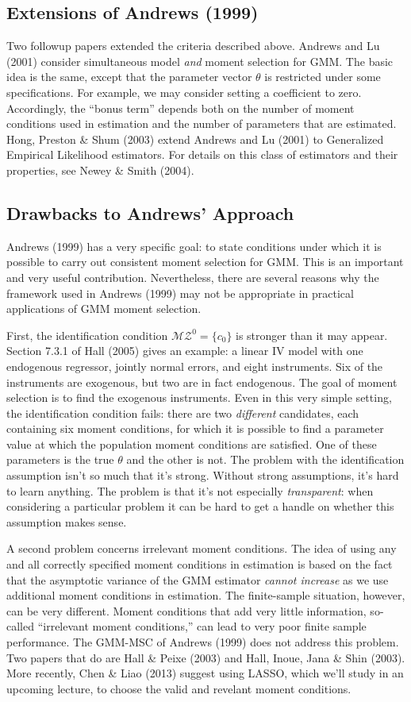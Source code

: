 \subsection{Extensions of Andrews (1999)}
Two followup papers extended the criteria described above. Andrews and Lu (2001) consider simultaneous model \emph{and} moment selection for GMM. The basic idea is the same, except that the parameter vector $\theta$ is restricted under some specifications. For example, we may consider setting a coefficient to zero. Accordingly, the ``bonus term'' depends both on the number of moment conditions used in estimation and the number of parameters that are estimated. Hong, Preston \& Shum (2003) extend Andrews and Lu (2001) to Generalized Empirical Likelihood estimators. For details on this class of estimators and their properties, see Newey \& Smith (2004). 

\subsection{Drawbacks to Andrews' Approach}
Andrews (1999) has a very specific goal: to state conditions under which it is possible to carry out consistent moment selection for GMM. This is an important and very useful contribution. Nevertheless, there are several reasons why the framework used in Andrews (1999) may not be appropriate in practical applications of GMM moment selection. 

First, the identification condition $\mathcal{MZ}^0 = \{c_0\}$ is stronger than it may appear. Section 7.3.1 of Hall (2005) gives an example: a linear IV model with one endogenous regressor, jointly normal errors, and eight instruments. Six of the instruments are exogenous, but two are in fact endogenous. The goal of moment selection is to find the exogenous instruments. Even in this very simple setting, the identification condition fails: there are two \emph{different} candidates, each containing six moment conditions, for which it is possible to find a parameter value at which the population moment conditions are satisfied. One of these parameters is the true $\theta$ and the other is not. The problem with the identification assumption isn't so much that it's strong. Without strong assumptions, it's hard to learn anything. The problem is that it's not especially \emph{transparent}: when considering a particular problem it can be hard to get a handle on whether this assumption makes sense.  


A second problem concerns irrelevant moment conditions. The idea of using any and all correctly specified moment conditions in estimation is based on the fact that the asymptotic variance of the GMM estimator \emph{cannot increase} as we use additional moment conditions in estimation. The finite-sample situation, however, can be very different. Moment conditions that add very little information, so-called ``irrelevant moment conditions,'' can lead to very poor finite sample performance. The GMM-MSC of Andrews (1999) does not address this problem. Two papers that do are Hall \& Peixe (2003) and Hall, Inoue, Jana \& Shin (2003). More recently, Chen \& Liao (2013) suggest using LASSO, which we'll study in an upcoming lecture, to choose the valid and revelant moment conditions.


